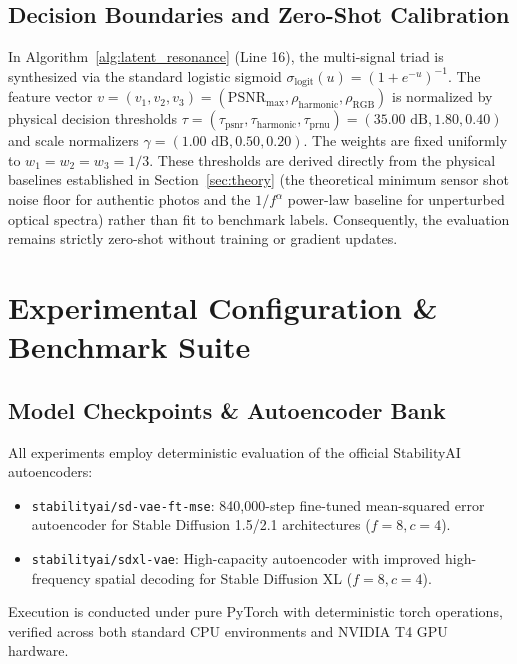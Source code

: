 \documentclass[11pt]{article}
\theoremstyle{definition}
\begin{document}
\subsection{Decision Boundaries and Zero-Shot Calibration}
\label{sec:calibration}
In Algorithm~\ref{alg:latent_resonance} (Line 16), the multi-signal triad is synthesized via the standard logistic sigmoid $\sigma_{\text{logit}}(u) = (1 + e^{-u})^{-1}$. The feature vector $v = (v_1, v_2, v_3) = (\text{PSNR}_{\max}, \rho_{\text{harmonic}}, \rho_{\text{RGB}})$ is normalized by physical decision thresholds $\tau = (\tau_{\text{psnr}}, \tau_{\text{harmonic}}, \tau_{\text{prnu}}) = (35.00\text{ dB}, 1.80, 0.40)$ and scale normalizers $\gamma = (1.00\text{ dB}, 0.50, 0.20)$. The weights are fixed uniformly to $w_1 = w_2 = w_3 = 1/3$. These thresholds are derived directly from the physical baselines established in Section~\ref{sec:theory} (the theoretical minimum sensor shot noise floor for authentic photos and the $1/f^\alpha$ power-law baseline for unperturbed optical spectra) rather than fit to benchmark labels. Consequently, the evaluation remains strictly zero-shot without training or gradient updates.

\section{Experimental Configuration \& Benchmark Suite}
\label{sec:experiments}

\subsection{Model Checkpoints \& Autoencoder Bank}
All experiments employ deterministic evaluation of the official StabilityAI autoencoders:
\begin{itemize}
    \item \texttt{stabilityai/sd-vae-ft-mse}: 840,000-step fine-tuned mean-squared error autoencoder for Stable Diffusion 1.5/2.1 architectures ($f=8, c=4$).
    \item \texttt{stabilityai/sdxl-vae}: High-capacity autoencoder with improved high-frequency spatial decoding for Stable Diffusion XL ($f=8, c=4$).
\end{itemize}
Execution is conducted under pure PyTorch with deterministic torch operations, verified across both standard CPU environments and NVIDIA T4 GPU hardware.
\end{document}
